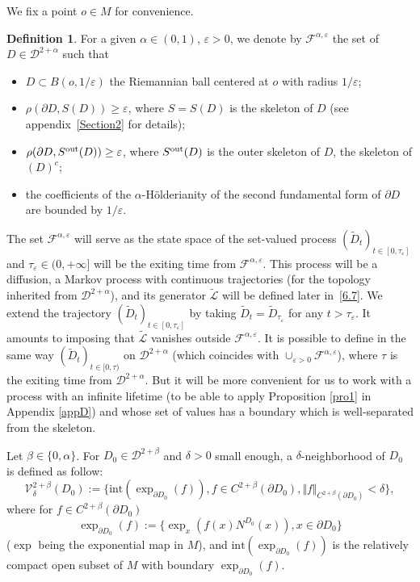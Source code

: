 \documentclass[10pt]{amsart}
\let\epsilon\varepsilon
\theoremstyle{plain}
\theoremstyle{definition}
\newtheorem{definition}[thm]{Definition}
\newcommand{\SD}{{\mathscr D}}
\newcommand{\SL}{{\mathscr L}}
\newcommand{\barD}{D}
\newcommand{\inte}{\mathrm{int}}
\let\a\alpha
\let\b\beta
\let\d\delta
\let\e\varepsilon
\let\pa\partial
\let\wi\widetilde
\let\iy\infty
\newcommand{\cD}{\mathcal{D}}
\newcommand{\cF}{\mathcal{F}}
\begin{document}
We fix a point $o\in M$ for convenience.
\begin{definition}
\label{D6.1}
For a given $\a\in(0,1)$, $\e>0$,
we denote by $\cF^{\alpha,\e}$ the set of $D\in \SD^{2+\a}$ such that
\begin{itemize}
\item $D\subset B(o,1/\e)$ the Riemannian ball centered at $o$ with radius $1/\e$;
\item $\rho(\partial D, S(D))\geq \e$,
where $S=S(D)$ is the skeleton of $D$ (see appendix~\ref{Section2} for details);
\item $\rho(\partial D, S^{\rm out}(D))\geq \e$,
where $S^{\rm out}(D)$ is the outer skeleton of $D$, \ie the skeleton of $(\barD )^c$;
\item the coefficients of the $\alpha$-Hölderianity of the second fundamental form of $\pa D$ are bounded by $1/\epsilon$.
\end{itemize}
The set $\cF^{\alpha,\e}$ will serve as the state space of the set-valued process $(\wi D_t)_{t\in[0,{\tau_{\e}}]}$
and ${\tau_{\e}}\in(0,+\iy]$ will be the exiting time from $\cF^{\alpha,\e}$.
This process will be a diffusion, \ie a Markov process with continuous trajectories (for the topology inherited from $\SD^{2+\a}$),
and its generator $\wi \SL$ will be defined later in~\eqref{6.7}.
We extend the trajectory $(\wi D_t)_{t\in[0,{\tau_{\e}}]}$ by taking $\wi D_t=\wi D_{\tau_{\e}}$ for any $t> {\tau_{\e}}$.
It amounts to imposing that $\wi \SL$ vanishes outside $\cF^{\alpha,\e}$.
It is possible to define in the same way $(\wi D_t)_{t\in[0,{\tau})}$ on $\cD^{2+\a}$ (which coincides with $\cup_{\e>0}\cF^{\a,\e}$), where $\tau$ is the exiting time from $\cD^{2+\a}$.
But it will be more convenient for us to work with a process with an infinite lifetime (to be able to apply Proposition \ref{pro1} in Appendix \ref{appD}) and whose set of values has a boundary which is well-separated from the skeleton.
\end{definition}

Let $\b\in \{0,\a\}$.
For $D_0 \in \cD^{2+\b}$ and $\d>0$ small enough, a $\d$-neighborhood of $D_0$ is defined as follow:
\begin{equation}
\label{fV}
\mathcal{V}_\d^{2+\b}(D_0):= \bigl\{\inte(\exp_{\partial D_0} (f)), f \in C^{2+ \b} (\partial D_0), \Vert f \Vert_{C^{2 +\b}(\partial D_0)} < \d \bigr\},
\end{equation}
where for $f \in C^{2+ \b} (\partial D_0)$
\[
\exp_{\partial D_0} (f):= \bigl\{\exp_{x}(f(x)N^{D_0}(x)), x \in \partial D_0 \bigr\}
\]
($\exp$ being the exponential map in $M$),
and $\inte(\exp_{\partial D_0}(f))$ is the relatively compact open subset of $M$ with boundary $\exp_{\partial D_0}(f)$.
\end{document}

